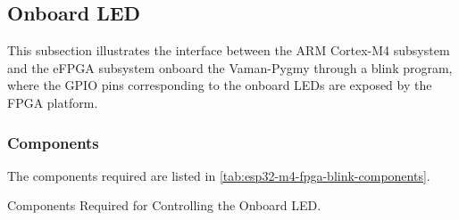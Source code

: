 \subsection{Onboard LED}
This subsection illustrates the interface between the ARM Cortex-M4 subsystem
and the eFPGA subsystem onboard the Vaman-Pygmy through a blink program, where
the GPIO pins corresponding to the onboard LEDs are exposed by the FPGA
platform.

\subsubsection{Components}
The components required are listed in
\autoref{tab:esp32-m4-fpga-blink-components}.
\begin{table}[!ht]
    \centering
    
    \caption{Components Required for Controlling the Onboard LED.}
    \label{tab:esp32-m4-fpga-blink-components}
\end{table}

